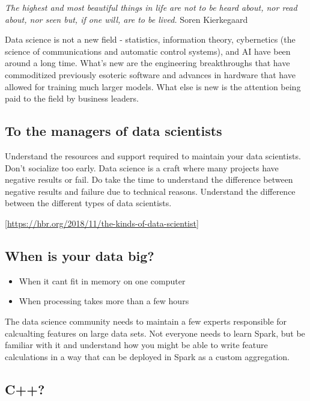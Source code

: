 \documentclass[
  11pt,
]{book}
\providecommand{\tightlist}{%
  \setlength{\itemsep}{0pt}\setlength{\parskip}{0pt}}
\begin{document}
\emph{The highest and most beautiful things in life are not to be heard about, nor read about, nor seen but, if one will, are to be lived.} Soren Kierkegaard

Data science is not a new field - statistics, information theory, cybernetics (the science of communications and automatic control systems), and AI have been around a long time. What's new are the engineering breakthroughs that have commoditized previously esoteric software and advances in hardware that have allowed for training much larger models. What else is new is the attention being paid to the field by business leaders.

\hypertarget{to-the-managers-of-data-scientists}{%
\subsection{To the managers of data scientists}\label{to-the-managers-of-data-scientists}}

Understand the resources and support required to maintain your data scientists. Don't socialize too early. Data science is a craft where many projects have negative results or fail. Do take the time to understand the difference between negative results and failure due to technical reasons. Understand the difference between the different types of data scientists.

{[}\url{https://hbr.org/2018/11/the-kinds-of-data-scientist}{]}

\hypertarget{when-is-your-data-big}{%
\subsection{When is your data big?}\label{when-is-your-data-big}}

\begin{itemize}
\tightlist
\item
  When it cant fit in memory on one computer
\item
  When processing takes more than a few hours
\end{itemize}

The data science community needs to maintain a few experts responsible for calcualting features on large data sets. Not everyone needs to learn Spark, but be familiar with it and understand how you might be able to write feature calculations in a way that can be deployed in Spark as a custom aggregation.

\hypertarget{c}{%
\subsection{C++?}\label{c}}
\end{document}
